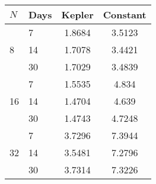 \begin{tabular}{l|lcc}
\hline
$N$ & Days & Kepler & Constant \\
\hline
\multirow{3}{*}{8} & 7 & 1.8684 & 3.5123 \\ 
&14 & 1.7078 & 3.4421 \\ 
&30 & 1.7029 & 3.4839 \\  \hline
\multirow{3}{*}{16}& 7 & 1.5535 & 4.834 \\ 
&14 & 1.4704 & 4.639 \\ 
&30 & 1.4743 & 4.7248 \\ \hline
\multirow{3}{*}{32}& 7 & 3.7296 & 7.3944 \\ 
&14 & 3.5481 & 7.2796 \\ 
&30 & 3.7314 & 7.3226 \\  \hline
\end{tabular}